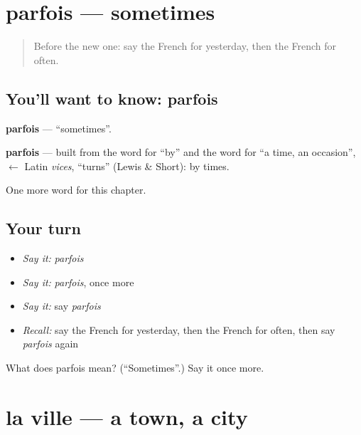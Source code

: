 \section[parfois]{parfois — sometimes}

\label{lesson:FR-C98-parfois}



\begin{quote}
Before the new one: say the French for yesterday, then the French for often.
\end{quote}

\subsection*{You'll want to know: parfois}
\textbf{parfois} — \textquotedblleft{}sometimes\textquotedblright{}.

\begin{cousinweb}
\textbf{parfois} — built from the word for \textquotedblleft{}by\textquotedblright{} and the word for \textquotedblleft{}a time, an occasion\textquotedblright{}, $\leftarrow$ Latin \emph{vices}, \textquotedblleft{}turns\textquotedblright{} (Lewis \& Short): by times.
\end{cousinweb}

\begin{grammarlens}[title={What you've built}]
One more word for this chapter.
\end{grammarlens}

\subsection*{Your turn}
\begin{itemize}
\raggedright
  \item \emph{Say it:} \emph{parfois}
  \item \emph{Say it:} \emph{parfois}, once more
  \item \emph{Say it:} say \emph{parfois}
  \item \emph{Recall:} say the French for yesterday, then the French for often, then say \emph{parfois} again
\end{itemize}

\begin{tcolorbox}[breakable,colback=teal!4,colframe=teal!35!black,title={Before you move on}]
What does parfois mean? (\textquotedblleft{}Sometimes\textquotedblright{}.) Say it once more.
\end{tcolorbox}
\section[la ville]{la ville — a town, a city}

